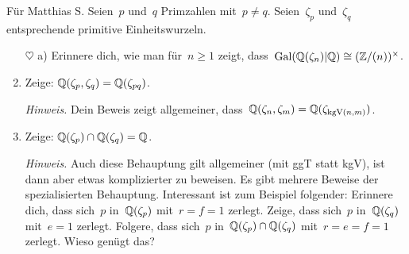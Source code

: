 \documentclass[entwurf]{uebblatt}
\begin{document}
\begin{aufgabe}{Für Matthias S.}
Seien~$p$ und~$q$ Primzahlen mit~$p \neq q$. Seien~$\zeta_p$ und~$\zeta_q$
entsprechende primitive Einheitswurzeln.
\begin{enumerate}
\item[$\heartsuit$ a)] Erinnere dich, wie man für~$n \geq 1$ zeigt,
dass~$\mathrm{Gal}(\mathbb{Q}(\zeta_n)|\mathbb{Q}) \cong (\mathbb{Z}/(n))^\times$.
\item Zeige: $\mathbb{Q}(\zeta_p, \zeta_q) = \mathbb{Q}(\zeta_{pq})$.

{\tiny\emph{Hinweis.} Dein Beweis zeigt allgemeiner, dass~$\mathbb{Q}(\zeta_n,
\zeta_m) = \mathbb{Q}(\zeta_{\operatorname{kgV}(n,m)})$.\par}
\item Zeige: $\mathbb{Q}(\zeta_p) \cap \mathbb{Q}(\zeta_q) = \mathbb{Q}$.

{\tiny\emph{Hinweis.} Auch diese Behauptung gilt allgemeiner (mit ggT statt
kgV), ist dann aber etwas komplizierter zu beweisen. Es gibt mehrere Beweise
der spezialisierten Behauptung. Interessant ist zum Beispiel folgender:
Erinnere dich, dass sich~$p$ in~$\mathbb{Q}(\zeta_p)$ mit~$r = f = 1$ zerlegt. Zeige,
dass sich~$p$ in~$\mathbb{Q}(\zeta_q)$ mit~$e = 1$ zerlegt. Folgere, dass sich~$p$
in~$\mathbb{Q}(\zeta_p) \cap \mathbb{Q}(\zeta_q)$ mit~$r = e = f = 1$ zerlegt. Wieso genügt
das?\par}
\end{enumerate}
\end{aufgabe}
\end{document}
